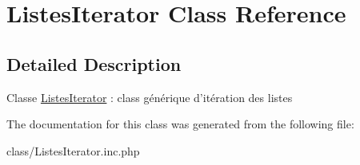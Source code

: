 \hypertarget{class_listes_iterator}{
\section{ListesIterator Class Reference}
\label{class_listes_iterator}
}


\subsection{Detailed Description}
Classe \hyperlink{class_listes_iterator}{ListesIterator} : class générique d'itération des listes 

The documentation for this class was generated from the following file:\begin{DoxyCompactItemize}
\item 
class/ListesIterator.inc.php\end{DoxyCompactItemize}
